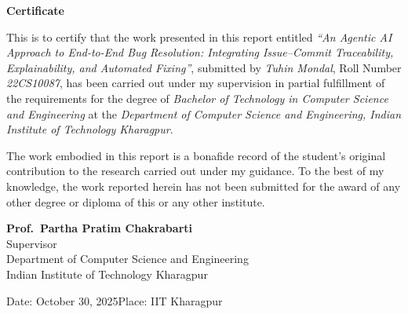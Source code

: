 \begin{center}
    \textbf{\Large Certificate}\\[0.4in]
\end{center}

This is to certify that the work presented in this report entitled \emph{``An Agentic AI Approach to End-to-End Bug Resolution: Integrating Issue–Commit Traceability, Explainability, and Automated Fixing''}, submitted by \emph{Tuhin Mondal}, Roll Number \emph{22CS10087}, has been carried out under my supervision in partial fulfillment of the requirements for the degree of \emph{Bachelor of Technology in Computer Science and Engineering} at the \emph{Department of Computer Science and Engineering, Indian Institute of Technology Kharagpur}.\\

\vspace{0.1in}

The work embodied in this report is a bonafide record of the student’s original contribution to the research carried out under my guidance. To the best of my knowledge, the work reported herein has not been submitted for the award of any other degree or diploma of this or any other institute.

\vspace{4in}

\begin{flushright}
\textbf{Prof.\ Partha Pratim Chakrabarti}\\
Supervisor\\
Department of Computer Science and Engineering\\
Indian Institute of Technology Kharagpur\\
\end{flushright}

\vspace{0.8in}
\noindent
Date: October 30, 2025\hfill Place: IIT Kharagpur

\newpage
